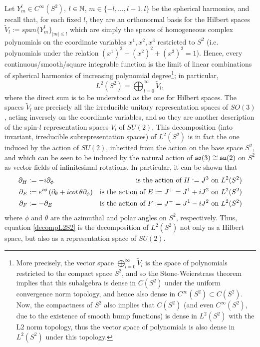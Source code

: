 Let $Y^l_m \in C^\infty (S^2)$, $l \in \mathbb{N}$, $m \in \{-l, \dots, l-1, l\}$ be the spherical harmonics, and recall that, for each fixed $l$, they are an orthonormal basis for the Hilbert spaces $\tilde V_l := span\{Y^l_m\}_{|m| \leq l}$ which are simply the spaces of homogeneous complex polynomials on the coordinate variables $x^1, x^2, x^3$ restricted to $S^2$ (i.e. polynomials under the relation $(x^1)^2 + (x^2)^2 + (x^3)^2 = 1$). Hence, every continuous/smooth/square integrable function is the limit of linear combinations of spherical harmonics of increasing polynomial degree\footnote{More precisely, the vector space $\bigoplus_{l = 0}^\infty \tilde V_l$ is the space of polynomials restricted to the compact space $S^2$, and so the Stone-Weierstrass theorem implies that this subalgebra is dense in $C(S^2)$ under the uniform convergence norm topology, and hence also dense in $C^\infty(S^2) \subset C(S^2)$. Now, the compactness of $S^2$ also implies that $C(S^2)$ (and even $C^\infty(S^2)$, due to the existence of smooth bump functions) is dense in $L^2(S^2)$ with the L$2$ norm topology, thus the vector space of polynomials is also dense in $L^2(S^2)$ under this topology.}; 
in particular, 
\begin{equation} \label{decompL2S2}
L^2(S^2) = \bigoplus_{l = 0}^\infty \tilde V_l,
\end{equation}
where the direct sum is to be understood as the one for Hilbert spaces.
The spaces $\tilde V_l$ are precisely all the irreducible unitary representation spaces of $SO(3)$, acting inversely on the coordinate variables, and so they are another description of the spin-$l$ representation spaces $V_l$ of $SU(2)$. This decomposition (into invariant, irreducible subrepresentation spaces) of $L^2(S^2)$ is in fact the one induced by the action of $SU(2)$, inherited from the action on the base space $S^2$, and which can be seen to be induced by the natural action of $\mathfrak{so}(3) \cong \mathfrak{su}(2)$ on $S^2$ as vector fields of infinitesimal rotations. In particular, it can be shown that
\begin{align}
    \partial_H &:= - i \partial_\phi & \text{is the action of $\lbtext{H} := J^3$ on $L^2(S^2)$} \\
    \partial_E &:= e^{i\phi} \left( \partial_\theta + i cot\,\theta \partial_\phi \right) &\text{is the action of $\lbtext{E} := J^+ = J^1 + i J^2$ on $L^2(S^2)$}\\
    \partial_F &:= - \partial_E &\text{is the action of $\lbtext{F} := J^- = J^1 - i J^2$ on $L^2(S^2)$}
\end{align} where $\phi$ and $\theta$ are the azimuthal and polar angles on $S^2$, respectively.
Thus, equation \eqref{decompL2S2} is the decomposition of $L^2(S^2)$ not only as a Hilbert space, but also as a representation space of $SU(2)$.

